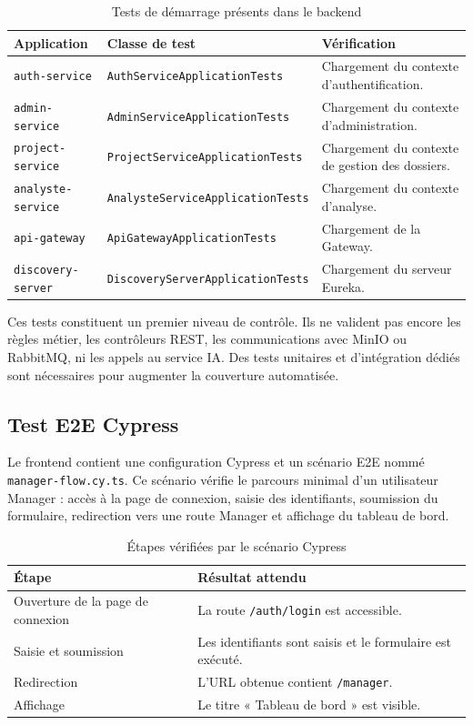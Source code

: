 \begin{table}[H]
\centering
\small
\caption{Tests de démarrage présents dans le backend}
\label{tab:tests-demarrage}
\begin{tabularx}{\textwidth}{p{3.2cm}p{4.7cm}Y}
\toprule
\textbf{Application} & \textbf{Classe de test} & \textbf{Vérification} \\
\midrule
\texttt{auth-service} & \texttt{AuthServiceApplicationTests} & Chargement du contexte d'authentification. \\
\texttt{admin-service} & \texttt{AdminServiceApplicationTests} & Chargement du contexte d'administration. \\
\texttt{project-service} & \texttt{ProjectServiceApplicationTests} & Chargement du contexte de gestion des dossiers. \\
\texttt{analyste-service} & \texttt{AnalysteServiceApplicationTests} & Chargement du contexte d'analyse. \\
\texttt{api-gateway} & \texttt{ApiGatewayApplicationTests} & Chargement de la Gateway. \\
\texttt{discovery-server} & \texttt{DiscoveryServerApplicationTests} & Chargement du serveur Eureka. \\
\bottomrule
\end{tabularx}
\end{table}

Ces tests constituent un premier niveau de contrôle. Ils ne valident pas encore les règles métier, les contrôleurs REST, les communications avec MinIO ou RabbitMQ, ni les appels au service IA. Des tests unitaires et d'intégration dédiés sont nécessaires pour augmenter la couverture automatisée.

\subsection{Test E2E Cypress}

Le frontend contient une configuration Cypress et un scénario E2E nommé \texttt{manager-flow.cy.ts}. Ce scénario vérifie le parcours minimal d'un utilisateur Manager : accès à la page de connexion, saisie des identifiants, soumission du formulaire, redirection vers une route Manager et affichage du tableau de bord.

\begin{table}[H]
\centering
\caption{Étapes vérifiées par le scénario Cypress}
\label{tab:test-cypress}
\begin{tabularx}{\textwidth}{p{5cm}Y}
\toprule
\textbf{Étape} & \textbf{Résultat attendu} \\
\midrule
Ouverture de la page de connexion & La route \texttt{/auth/login} est accessible. \\
Saisie et soumission & Les identifiants sont saisis et le formulaire est exécuté. \\
Redirection & L'URL obtenue contient \texttt{/manager}. \\
Affichage & Le titre « Tableau de bord » est visible. \\
\bottomrule
\end{tabularx}
\end{table}

